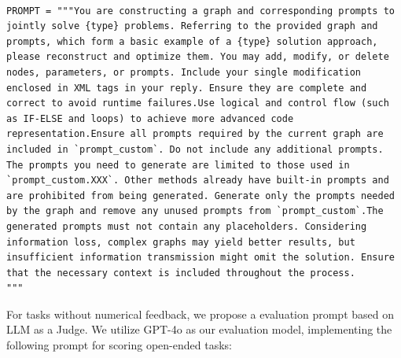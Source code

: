 \documentclass{article} %
\theoremstyle{plain}
\theoremstyle{definition}
\theoremstyle{remark}
\begin{document}
\begin{tcolorbox}[title={\textbf{\small Workflow optimize prompt for open-ended tasks}}, boxrule=2pt, arc=0mm, breakable]\begin{verbatim}

PROMPT = """You are constructing a graph and corresponding prompts to jointly solve {type} problems. Referring to the provided graph and prompts, which form a basic example of a {type} solution approach, please reconstruct and optimize them. You may add, modify, or delete nodes, parameters, or prompts. Include your single modification enclosed in XML tags in your reply. Ensure they are complete and correct to avoid runtime failures.Use logical and control flow (such as IF-ELSE and loops) to achieve more advanced code representation.Ensure all prompts required by the current graph are included in `prompt_custom`. Do not include any additional prompts. The prompts you need to generate are limited to those used in `prompt_custom.XXX`. Other methods already have built-in prompts and are prohibited from being generated. Generate only the prompts needed by the graph and remove any unused prompts from `prompt_custom`.The generated prompts must not contain any placeholders. Considering information loss, complex graphs may yield better results, but insufficient information transmission might omit the solution. Ensure that the necessary context is included throughout the process.
"""
\end{verbatim}
\end{tcolorbox}

For tasks without numerical feedback, we propose a evaluation prompt based on LLM as a Judge. We utilize GPT-4o as our evaluation model, implementing the following prompt for scoring open-ended tasks:

\label{appendix:evaluation prompt}
\end{document}
